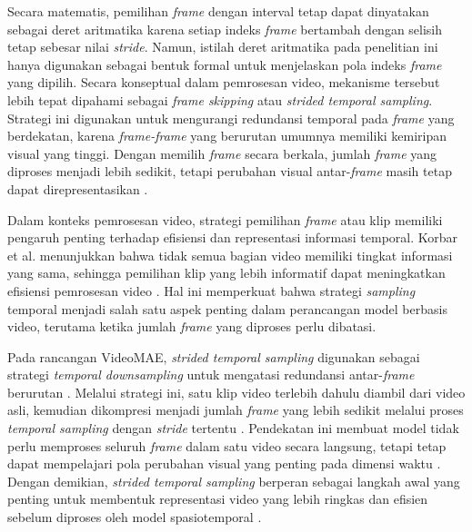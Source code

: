 Secara matematis, pemilihan \textit{frame} dengan interval tetap dapat dinyatakan sebagai deret aritmatika karena setiap indeks \textit{frame} bertambah dengan selisih tetap sebesar nilai \textit{stride}. Namun, istilah deret aritmatika pada penelitian ini hanya digunakan sebagai bentuk formal untuk menjelaskan pola indeks \textit{frame} yang dipilih. Secara konseptual dalam pemrosesan video, mekanisme tersebut lebih tepat dipahami sebagai \textit{frame skipping} atau \textit{strided temporal sampling}. Strategi ini digunakan untuk mengurangi redundansi temporal pada \textit{frame} yang berdekatan, karena \textit{frame-frame} yang berurutan umumnya memiliki kemiripan visual yang tinggi. Dengan memilih \textit{frame} secara berkala, jumlah \textit{frame} yang diproses menjadi lebih sedikit, tetapi perubahan visual antar-\textit{frame} masih tetap dapat direpresentasikan \cite{tong2022videomaemaskedautoencodersdataefficient}\cite{bertasius2021spacetimeattentionneedvideo}\cite{arnab2021vivitvideovisiontransformer}. \par

Dalam konteks pemrosesan video, strategi pemilihan \textit{frame} atau klip memiliki pengaruh penting terhadap efisiensi dan representasi informasi temporal. Korbar et al. menunjukkan bahwa tidak semua bagian video memiliki tingkat informasi yang sama, sehingga pemilihan klip yang lebih informatif dapat meningkatkan efisiensi pemrosesan video \cite{korbar2019scsamplersamplingsalientclips}. Hal ini memperkuat bahwa strategi \textit{sampling} temporal menjadi salah satu aspek penting dalam perancangan model berbasis video, terutama ketika jumlah \textit{frame} yang diproses perlu dibatasi. \par

Pada rancangan VideoMAE, \textit{strided temporal sampling} digunakan sebagai strategi \textit{temporal downsampling} untuk mengatasi redundansi antar-\textit{frame} berurutan \cite{tong2022videomaemaskedautoencodersdataefficient}. Melalui strategi ini, satu klip video terlebih dahulu diambil dari video asli, kemudian dikompresi menjadi jumlah \textit{frame} yang lebih sedikit melalui proses \textit{temporal sampling} dengan \textit{stride} tertentu \cite{tong2022videomaemaskedautoencodersdataefficient}. Pendekatan ini membuat model tidak perlu memproses seluruh \textit{frame} dalam satu video secara langsung, tetapi tetap dapat mempelajari pola perubahan visual yang penting pada dimensi waktu \cite{tong2022videomaemaskedautoencodersdataefficient}. Dengan demikian, \textit{strided temporal sampling} berperan sebagai langkah awal yang penting untuk membentuk representasi video yang lebih ringkas dan efisien sebelum diproses oleh model spasiotemporal \cite{tong2022videomaemaskedautoencodersdataefficient}. \par

